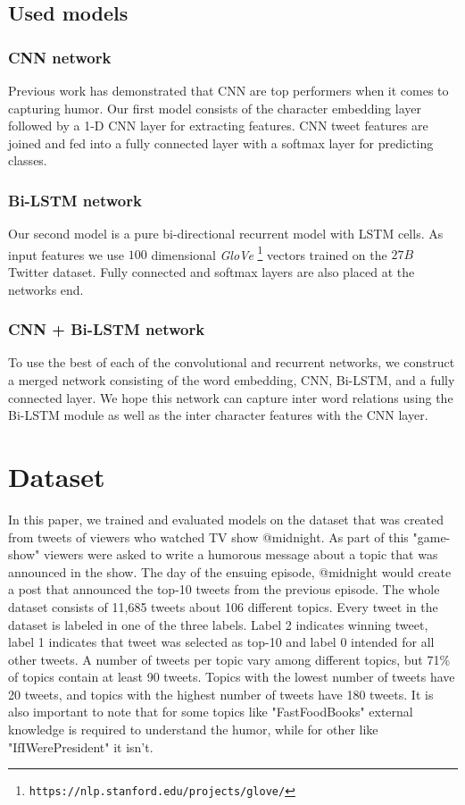 \documentclass[10pt, a4paper]{article}
\begin{document}
\subsection{Used models}

\subsubsection{CNN network}
Previous work \citep{onaj_rad_s_cnn} has demonstrated that CNN are top performers
when it comes to capturing humor. Our first model consists of the character
embedding layer followed by a 1-D CNN layer for extracting features. CNN tweet
features are joined and fed into a fully connected layer with a softmax layer
for predicting classes. 

\subsubsection{Bi-LSTM network}
Our second model is a pure bi-directional recurrent model with LSTM cells. As
input features we use $100$ dimensional \emph{GloVe} \footnote{\texttt{https://nlp.stanford.edu/projects/glove/}} \citep{glove2014} vectors trained on the $27B$
Twitter dataset. Fully connected and softmax layers are also placed at the
networks end.

\subsubsection{CNN + Bi-LSTM network}
To use the best of each of the convolutional and recurrent networks, we
construct a merged network consisting of the word embedding, CNN, Bi-LSTM, and
a fully connected layer. We hope this network can capture inter word relations
using the Bi-LSTM module as well as the inter character features with the CNN
layer.

\section{Dataset}

In this paper, we trained and evaluated models on the dataset that was created from tweets of viewers who watched TV show @midnight. As part of this "game-show" viewers were asked to write a humorous message about a topic that was announced in the show. The day of the ensuing episode, @midnight would create a post that announced the top-10 tweets from the previous episode. The whole dataset consists of 11,685 tweets about 106 different topics. Every tweet in the dataset is labeled in one of the three labels. Label 2 indicates winning tweet, label 1 indicates that tweet was selected as top-10 and label 0 intended for all other tweets. A number of tweets per topic vary among different topics, but 71\% of topics contain at least 90 tweets. Topics with the lowest number of tweets have 20 tweets, and topics with the highest number of tweets have 180 tweets. It is also important to note that for some topics like "FastFoodBooks" external knowledge is required to understand the humor, while for other like "IfIWerePresident" it isn't.
\end{document}
